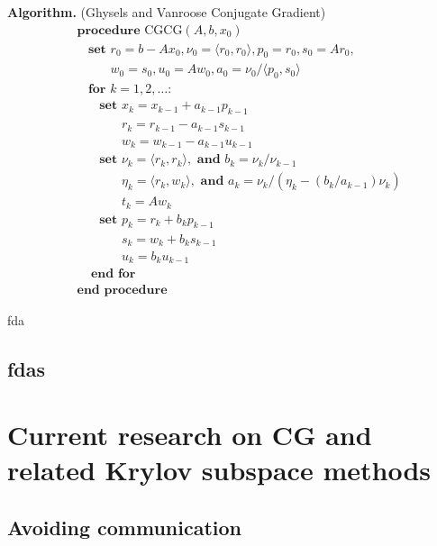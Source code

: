 \textbf{Algorithm.} (Ghysels and Vanroose Conjugate Gradient)
\begin{align*}
&\textbf{procedure}\text{ CGCG}( A,b,x_0 ) 
\\[-.4em]&~~~~\textbf{set } r_0 = b-Ax_0, \nu_0 = \langle r_0,r_0 \rangle, p_0 = r_0, s_0 = Ar_0, 
\\[-.4em]&~~~~\phantom{\textbf{set }}w_0 = s_0, u_0 = Aw_0, a_0 = \nu_0 / \langle p_0,s_0 \rangle
\\[-.4em]&~~~~\textbf{for } k=1,2,\ldots \textbf{:} 
\\[-.4em]&~~~~~~~~\textbf{set } x_k = x_{k-1} + a_{k-1} p_{k-1} 
\\[-.4em]&~~~~~~~~\phantom{\textbf{set }} r_k = r_{k-1} - a_{k-1} s_{k-1} 
\\[-.4em]&~~~~~~~~\phantom{\textbf{set }} w_k = w_{k-1} - a_{k-1} u_{k-1}
\\[-.4em]&~~~~~~~~\textbf{set } \nu_k = \langle r_k,r_k\rangle, \textbf{ and } b_k = \nu_k/\nu_{k-1}
\\[-.4em]&~~~~~~~~\phantom{\textbf{set }} \eta_{k} = \langle r_k,w_k \rangle, \textbf{ and } a_k = \nu_k / (\eta_k - (b_k/a_{k-1})\nu_k)
\\[-.4em]&~~~~~~~~\phantom{\textbf{set }} t_k = Aw_k
\\[-.4em]&~~~~~~~~\textbf{set } p_k = r_k + b_k p_{k-1}
\\[-.4em]&~~~~~~~~\phantom{\textbf{set }} s_k = w_k + b_k s_{k-1}
\\[-.4em]&~~~~~~~~\phantom{\textbf{set }} u_k = b_k u_{k-1}
\\[-.4em]&~~~~~\textbf{end for}
\\[-.4em]&\textbf{end procedure}
\end{align*}

fda

\hypertarget{fdas}{%
\subsection{fdas}\label{fdas}}

\hypertarget{current-research-on-cg-and-related-krylov-subspace-methods}{%
\section{Current research on CG and related Krylov subspace
methods}\label{current-research-on-cg-and-related-krylov-subspace-methods}}

\hypertarget{avoiding-communication}{%
\subsection{Avoiding communication}\label{avoiding-communication}}

